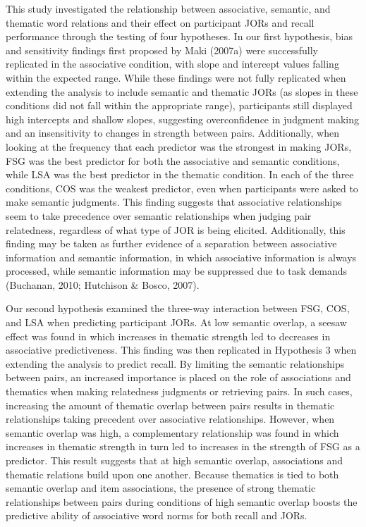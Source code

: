 \documentclass[english,man]{apa6}
\theoremstyle{definition}
\theoremstyle{definition}
\theoremstyle{definition}
\theoremstyle{remark}
\begin{document}
This study investigated the relationship between associative, semantic,
and thematic word relations and their effect on participant JORs and
recall performance through the testing of four hypotheses. In our first
hypothesis, bias and sensitivity findings first proposed by Maki (2007a)
were successfully replicated in the associative condition, with slope
and intercept values falling within the expected range. While these
findings were not fully replicated when extending the analysis to
include semantic and thematic JORs (as slopes in these conditions did
not fall within the appropriate range), participants still displayed
high intercepts and shallow slopes, suggesting overconfidence in
judgment making and an insensitivity to changes in strength between
pairs. Additionally, when looking at the frequency that each predictor
was the strongest in making JORs, FSG was the best predictor for both
the associative and semantic conditions, while LSA was the best
predictor in the thematic condition. In each of the three conditions,
COS was the weakest predictor, even when participants were asked to make
semantic judgments. This finding suggests that associative relationships
seem to take precedence over semantic relationships when judging pair
relatedness, regardless of what type of JOR is being elicited.
Additionally, this finding may be taken as further evidence of a
separation between associative information and semantic information, in
which associative information is always processed, while semantic
information may be suppressed due to task demands (Buchanan, 2010;
Hutchison \& Bosco, 2007).

Our second hypothesis examined the three-way interaction between FSG,
COS, and LSA when predicting participant JORs. At low semantic overlap,
a seesaw effect was found in which increases in thematic strength led to
decreases in associative predictiveness. This finding was then
replicated in Hypothesis 3 when extending the analysis to predict
recall. By limiting the semantic relationships between pairs, an
increased importance is placed on the role of associations and thematics
when making relatedness judgments or retrieving pairs. In such cases,
increasing the amount of thematic overlap between pairs results in
thematic relationships taking precedent over associative relationships.
However, when semantic overlap was high, a complementary relationship
was found in which increases in thematic strength in turn led to
increases in the strength of FSG as a predictor. This result suggests
that at high semantic overlap, associations and thematic relations build
upon one another. Because thematics is tied to both semantic overlap and
item associations, the presence of strong thematic relationships between
pairs during conditions of high semantic overlap boosts the predictive
ability of associative word norms for both recall and JORs.
\end{document}
